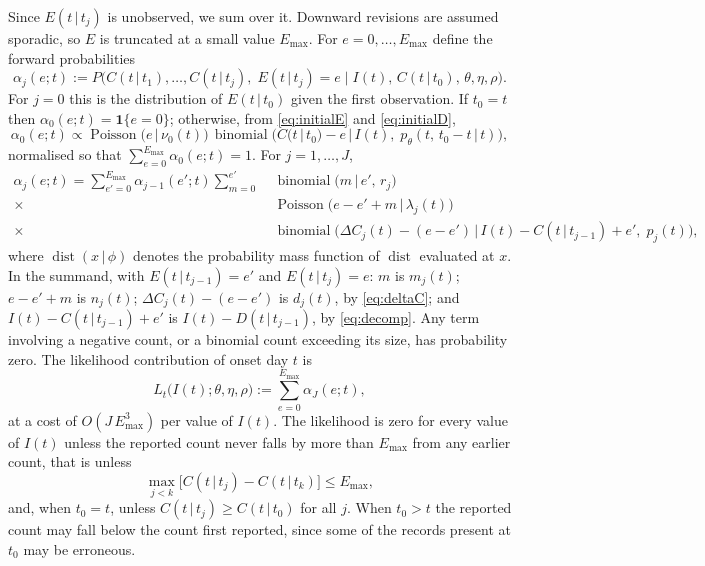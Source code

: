 \documentclass[11pt,a4paper]{article}
\newcommand{\given}{\,|\,}
\newcommand{\bin}{\operatorname{binomial}}
\newcommand{\pois}{\operatorname{Poisson}}
\newcommand{\Emax}{E_{\max}}
\begin{document}
Since $E(t\given t_j)$ is unobserved, we sum over it. Downward revisions are
assumed sporadic, so $E$ is truncated at a small value $\Emax$. For
$e=0,\dots,\Emax$ define the forward probabilities
\begin{equation}
\alpha_j(e;t) := P\bigl(C(t\given t_1),\dots,C(t\given t_j),\; E(t\given t_j)=e
\;\big|\; I(t),\, C(t\given t_0),\, \theta,\eta,\rho\bigr).
\end{equation}
For $j=0$ this is the distribution of $E(t\given t_0)$ given the first
observation. If $t_0=t$ then $\alpha_0(e;t)=\mathbf{1}\{e=0\}$; otherwise, from
\eqref{eq:initialE} and \eqref{eq:initialD},
\begin{equation}\label{eq:alpha0}
\alpha_0(e;t)\propto\pois\bigl(e\given\nu_0(t)\bigr)\,
\bin\bigl(C(t\given t_0)-e \given I(t),\;p_\theta(t,\,t_0-t\given t)\bigr),
\end{equation}
normalised so that $\sum_{e=0}^{\Emax}\alpha_0(e;t)=1$. For $j=1,\dots,J$,
\begin{equation}\label{eq:forward}
\begin{aligned}
\alpha_j(e;t) = \sum_{e'=0}^{\Emax} \alpha_{j-1}(e';t) \sum_{m=0}^{e'}
\;&\bin\bigl(m \given e',\, r_j\bigr) \\
\times\;&\pois\bigl(e-e'+m \given \lambda_j(t)\bigr) \\
\times\;&\bin\bigl(\Delta C_j(t)-(e-e') \given I(t)-C(t\given t_{j-1})+e',\; p_j(t)\bigr),
\end{aligned}
\end{equation}
where $\operatorname{dist}(x\given\phi)$ denotes the probability mass function
of $\operatorname{dist}$ evaluated at $x$. In the summand, with
$E(t\given t_{j-1})=e'$ and $E(t\given t_j)=e$: $m$ is $m_j(t)$; $e-e'+m$ is
$n_j(t)$; $\Delta C_j(t)-(e-e')$ is $d_j(t)$, by \eqref{eq:deltaC}; and
$I(t)-C(t\given t_{j-1})+e'$ is $I(t)-D(t\given t_{j-1})$, by \eqref{eq:decomp}.
Any term involving a negative count, or a binomial count exceeding its size,
has probability zero. The likelihood contribution of onset day $t$ is
\begin{equation}\label{eq:lik}
L_t\bigl(I(t);\theta,\eta,\rho\bigr) := \sum_{e=0}^{\Emax}\alpha_J(e;t),
\end{equation}
at a cost of $O(J\,\Emax^3)$ per value of $I(t)$. The likelihood is zero for
every value of $I(t)$ unless the reported count never falls by more than $\Emax$
from any earlier count, that is unless
\begin{equation}\label{eq:feasible}
\max_{j<k}\bigl[C(t\given t_j)-C(t\given t_k)\bigr]\le\Emax ,
\end{equation}
and, when $t_0=t$, unless $C(t\given t_j)\ge C(t\given t_0)$ for all $j$. When
$t_0>t$ the reported count may fall below the count first reported, since some
of the records present at $t_0$ may be erroneous.
\end{document}
